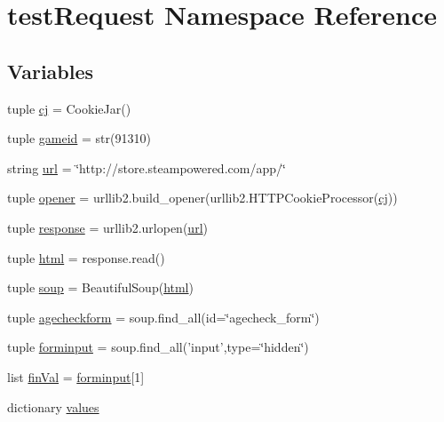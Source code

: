 \hypertarget{namespacetest_request}{\section{test\+Request Namespace Reference}
\label{namespacetest_request}
}
\subsection*{Variables}
\begin{DoxyCompactItemize}
\item 
tuple \hyperlink{namespacetest_request_afd477347e61eaf087de75394b8249088}{cj} = Cookie\+Jar()
\item 
tuple \hyperlink{namespacetest_request_ad59cb201aaea659d05de3a976c43d2d0}{gameid} = str(91310)
\item 
string \hyperlink{namespacetest_request_a503c8624234f46b468f9d0b807d63cb0}{url} = \char`\"{}http\+://store.\+steampowered.\+com/app/\char`\"{}
\item 
tuple \hyperlink{namespacetest_request_a32d478514621667126784650159375ae}{opener} = urllib2.\+build\+\_\+opener(urllib2.\+H\+T\+T\+P\+Cookie\+Processor(\hyperlink{namespacetest_request_afd477347e61eaf087de75394b8249088}{cj}))
\item 
tuple \hyperlink{namespacetest_request_a82a62563089eee6f274889ef4cda4c83}{response} = urllib2.\+urlopen(\hyperlink{namespacetest_request_a503c8624234f46b468f9d0b807d63cb0}{url})
\item 
tuple \hyperlink{namespacetest_request_a8f35331152c0a50dcf80c4e88192e928}{html} = response.\+read()
\item 
tuple \hyperlink{namespacetest_request_abdcf7c50bc605e36463827591ea27597}{soup} = Beautiful\+Soup(\hyperlink{namespacetest_request_a8f35331152c0a50dcf80c4e88192e928}{html})
\item 
tuple \hyperlink{namespacetest_request_a577a66202d87bdc38bab9969bd0b0be8}{agecheckform} = soup.\+find\+\_\+all(id=\char`\"{}agecheck\+\_\+form\char`\"{})
\item 
tuple \hyperlink{namespacetest_request_a9dd80d2ee25233da56bf90ee2b6562f8}{forminput} = soup.\+find\+\_\+all('input',type=\char`\"{}hidden\char`\"{})
\item 
list \hyperlink{namespacetest_request_ac0dc477bbe063b2dc0a1e8fab9086a45}{fin\+Val} = \hyperlink{namespacetest_request_a9dd80d2ee25233da56bf90ee2b6562f8}{forminput}\mbox{[}1\mbox{]}
\item 
dictionary \hyperlink{namespacetest_request_ad045126755bc1baa0a4cacb58d77b4a1}{values}

\end{DoxyCompactItemize}
